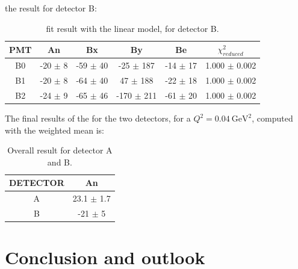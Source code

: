 the result for detector B:
\begin{table}[h]
\centering
\begin{tabular}{c|c|c|c|c|c}
\hline
 PMT   & An         & Bx         & By           & Be        & $\chi^{2}_{reduced}$\\
\hline
 B0    & -20 $\pm$ 8 & -59 $\pm$ 40 & -25 $\pm$ 187  & -14 $\pm$ 17  & 1.000 $\pm$ 0.002 \\
 B1    & -20 $\pm$ 8  & -64 $\pm$ 40 & 47 $\pm$ 188    & -22 $\pm$ 18 & 1.000 $\pm$ 0.002 \\
 B2    & -24 $\pm$ 9 & -65 $\pm$ 46 & -170 $\pm$ 211 & -61 $\pm$ 20 & 1.000 $\pm$ 0.002 \\
\hline
\end{tabular}
\caption{fit result with the linear model, for detector B.}
\end{table}

The final results of the \transv for the two detectors, for a $Q^{2} = \SI{0.04}{\giga \electronvolt \squared}$, computed with the weighted mean is:

\begin{table}[h]
\centering
\begin{tabular}{c|c}
\hline
 DETECTOR   & An    \\
\hline
 A          & 23.1 $\pm$ 1.7  \\
 B          & -21 $\pm$ 5   \\
\hline
\end{tabular}
\caption{Overall result for detector A and B.}
\end{table}
 

\chapter{Conclusion and outlook} \label{conclusion}

